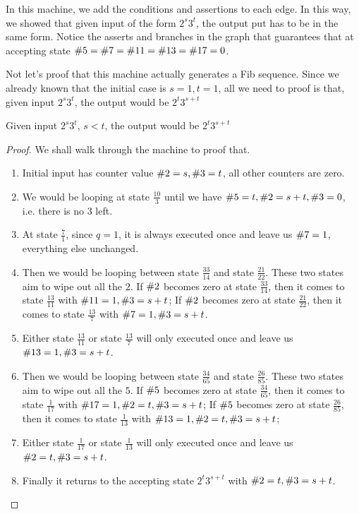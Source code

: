 In this machine, we add the conditions and assertions to each edge.
In this way, we showed that given input of the form $2^s3^t$, the output put has to be in the same form.
Notice the asserts and branches in the graph that guarantees that at accepting state $\V = \VII = \XI = \XIII = \XVII = 0$.

Not let's proof that this machine actually generates a Fib sequence.
Since we already known that the initial case is $s = 1, t = 1$, all we need to proof is that, given input $2^s3^t$, the output would be $2^t3^{s+t}$

\begin{theorem}
    Given input $2^s3^t$, $s < t$, the output would be $2^t3^{s+t}$
\end{theorem}

\begin{proof}

    We shall walk through the machine to proof that.
    \begin{enumerate}
        \item Initial input has counter value $\II = s, \III = t$, all other counters are zero.
        \item We would be looping at state $\frac{10}{3}$ until we have $\V = t, \II = s + t, \III = 0$, i.e. there is no $3$ left. 
        \item At state $\frac{7}{1}$, since $q = 1$, it is always executed once and leave us $\VII = 1$, everything else unchanged.
        \item Then we would be looping between state $\frac{33}{14}$ and state $\frac{21}{22}$. These two states aim to wipe out all the $2$. If $\II$ becomes zero at state $\frac{33}{14}$, then it comes to state $\frac{13}{11}$ with $\XI = 1, \III = s + t$; If $\II$ becomes zero at state $\frac{21}{22}$, then it comes to state $\frac{13}{7}$ with $\VII = 1, \III = s + t$.
        \item Either state $\frac{13}{11}$ or state $\frac{13}{7}$ will only executed once and leave us $\XIII = 1, \III = s + t$. 
        \item Then we would be looping between state $\frac{34}{65}$ and state $\frac{26}{85}$. These two states aim to wipe out all the $5$. If $\V$ becomes zero at state $\frac{34}{65}$, then it comes to state $\frac{1}{17}$ with $\XVII = 1, \II = t, \III = s + t$; If $\V$ becomes zero at state $\frac{26}{85}$, then it comes to state $\frac{1}{13}$ with $\XIII = 1, \II = t, \III = s + t$;
        \item Either state $\frac{1}{17}$ or state $\frac{1}{13}$ will only executed once and leave us $\II = t, \III = s + t$. 
        \item Finally it returns to the accepting state $2^t3^{s+t}$ with $\II = t, \III = s + t$. 
    \end{enumerate}
\end{proof}
